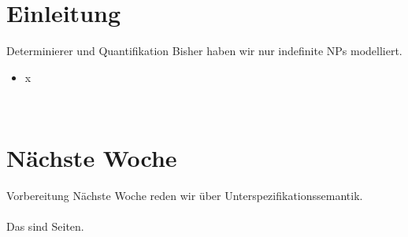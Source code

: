 \section{Einleitung}

\begin{frame}
  {Determinierer und Quantifikation}
  \onslide<+->
  \onslide<+->
  Bisher haben wir nur indefinite NPs modelliert.\\
  \Zeile
  \begin{itemize}[<+->]
    \item x
  \end{itemize}
  \Zeile
  \onslide<+->
  \centering 
  \\
\end{frame}


\section{Nächste Woche}

\begin{frame}
  {Vorbereitung}
  \centering 
  \large
  Nächste Woche reden wir über Unterspezifikationssemantik.\\
  \Zeile
  \\
  \Viertelzeile
  Das sind  Seiten.\\
\end{frame}
